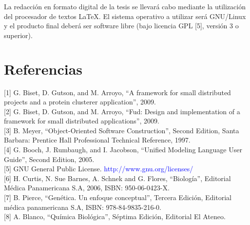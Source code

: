 \documentclass[12pt,a4paper]{article}
\begin{document}
\par La redacción en formato digital de la tesis se llevará cabo mediante la utilización del procesador de textos \LaTeX. El sistema operativo a utilizar será GNU/Linux y el producto final deberá ser software libre (bajo licencia GPL [5], versión 3 o superior).


\section*{Referencias}
[1] G. Biset, D. Gutson, and M. Arroyo, “A framework for small distributed projects and a protein clusterer application”, 2009. \\

[2] G. Biset, D. Gutson, and M. Arroyo, “Fud: Design and implementation of a framework for small distributed applications”, 2009. \\

[3] B. Meyer, “Object-Oriented Software Construction”, Second Edition, Santa Barbara: Prentice Hall Professional Technical Reference, 1997. \\

[4] G. Booch, J. Rumbaugh, and I. Jacobson, “Unified Modeling Language User Guide”, Second Edition, 2005. \\

[5] GNU General Public License. \textcolor{blue}{http://www.gnu.org/licenses/} \\

[6] H. Curtis, N. Sue Barnes, A. Schnek and G. Flores, “Biología”, Editorial Médica Panamericana S.A, 2006, ISBN: 950-06-0423-X. \\

[7] B. Pierce, “Genética. Un enfoque conceptual”, Tercera Edición, Editorial médica panamericana S.A, ISBN: 978-84-9835-216-0. \\

[8] A. Blanco, “Química Biológica”, Séptima Edición, Editorial El Ateneo.
\end{document}

